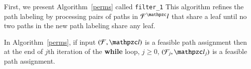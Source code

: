 \documentclass[MS,synopsis]{iitmdiss}
\begin{document}
First, we present Algorithm~\ref{perms} called {\tt filter\_1}
This algorithm refines the path labeling by
processing pairs of paths in $\cF^\cl$ that share a leaf until no two
paths in the new path labeling share any leaf.




\begin{lemma} 
 \label{lem:feasible} 
 In Algorithm~\ref{perms}, if input $(\cF, \cl)$ is a feasible path
 assignment then at the end of $j$th iteration of the {\bf while}
 loop, $j \ge 0$, $(\cF_j, \cl_j)$ is a feasible path assignment.
\end{lemma}
\end{document}
